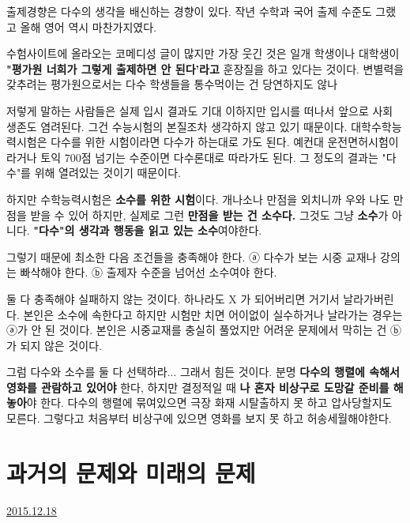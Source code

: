 \vspace{5mm}

출제경향은 다수의 생각을 배신하는 경향이 있다.
작년 수학과 국어 출제 수준도 그랬고 올해 영어 역시 마찬가지였다.
\vspace{5mm}

수험사이트에 올라오는 코메디성 글이 많지만 가장 웃긴 것은
일개 학생이나 대학생이 \textbf{"평가원 너희가 그렇게 출제하면 안 된다'라고} 훈장질을 하고 있다는 것이다.
변별력을 갖추려는 평가원으로서는 다수 학생들을 통수먹이는 건 당연하지도 않나
\vspace{5mm}

저렇게 말하는 사람들은 실제 입시 결과도 기대 이하지만 입시를 떠나서 앞으로 사회 생존도 염려된다.
그건 수능시험의 본질조차 생각하지 않고 있기 때문이다.
대학수학능력시험은 다수를 위한 시험이라면 다수가 하는대로 가도 된다.
예컨대 운전면허시험이라거나 토익 700점 넘기는 수준이면 다수론대로 따라가도 된다.
그 정도의 결과는 "다수"를 위해 열려있는 것이기 때문이다.
\vspace{5mm}

하지만 수학능력시험은 \textbf{소수를 위한 시험}이다.
개나소나 만점을 외치니까 우와 나도 만점을 받을 수 있어 하지만, 실제로 그런 \textbf{만점을 받는 건 소수다.}
그것도 그냥 \textbf{소수}가 아니다. \textbf{"\textbf{다수}"의 생각과 행동을 읽고 있는 \textbf{소수}}여야한다.
\vspace{5mm}

그렇기 때문에 최소한 다음 조건들을 충족해야 한다.
ⓐ 다수가 보는 시중 교재나 강의는 빠삭해야 한다.
ⓑ 출제자 수준을 넘어선 소수여야 한다.
\vspace{5mm}

둘 다 충족해야 실패하지 않는 것이다. 하나라도 X 가 되어버리면 거기서 날라가버린다.
본인은 소수에 속한다고 하지만 시험만 치면 어이없이 실수하거나 날라가는 경우는 ⓐ가 안 된 것이다.
본인은 시중교재를 충실히 풀었지만 어려운 문제에서 막히는 건 ⓑ가 되지 않은 것이다.
\vspace{5mm}

그럼 다수와 소수를 둘 다 선택하라... 그래서 힘든 것이다.
분명 \textbf{다수의 행렬에 속해서 영화를 관람하고 있어야} 한다,
하지만 결정적일 때 \textbf{나 혼자 비상구로 도망갈 준비를 해놓아}야 한다.
다수의 행렬에 묶여있으면 극장 화재 시탈출하지 못 하고 압사당할지도 모른다.
그렇다고 처음부터 비상구에 있으면 영화를 보지 못 하고 허송세월해야한다.








\section{과거의 문제와 미래의 문제}
\href{https://www.kockoc.com/Apoc/551104}{2015.12.18}

